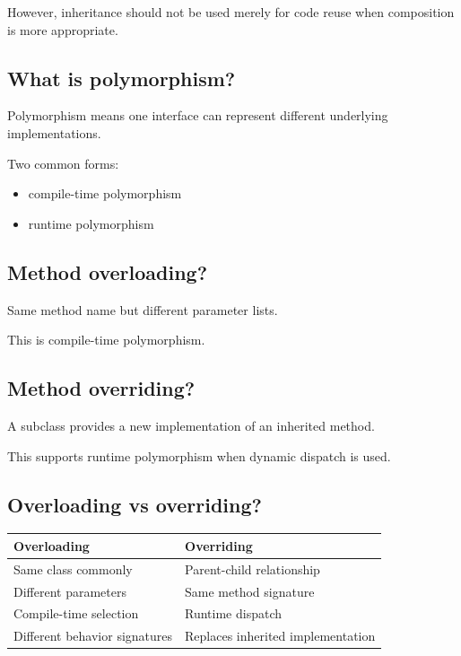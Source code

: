 However, inheritance should not be used merely for code reuse when composition is more appropriate.

\medskip

\subsection{What is polymorphism?}

Polymorphism means one interface can represent different underlying implementations.

Two common forms:

\begin{itemize}
  \item compile-time polymorphism
  \item runtime polymorphism
\end{itemize}

\medskip

\subsection{Method overloading?}

Same method name but different parameter lists.

This is compile-time polymorphism.

\medskip

\subsection{Method overriding?}

A subclass provides a new implementation of an inherited method.

This supports runtime polymorphism when dynamic dispatch is used.

\medskip

\subsection{Overloading vs overriding?}

\begin{center}
\setlength{\tabcolsep}{6pt}
\renewcommand{\arraystretch}{1.2}
\begin{tabular}{|l|l|}
\hline
\textbf{Overloading} & \textbf{Overriding} \\
\hline
Same class commonly & Parent-child relationship \\
Different parameters & Same method signature \\
Compile-time selection & Runtime dispatch \\
Different behavior signatures & Replaces inherited implementation \\
\hline
\end{tabular}
\end{center}

